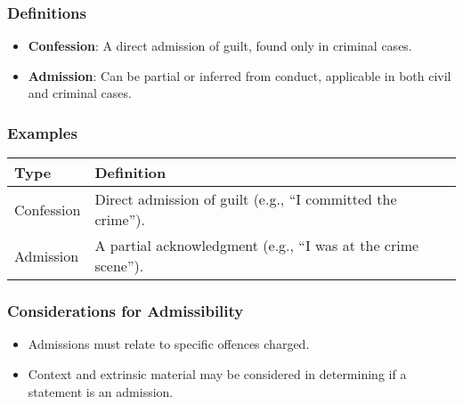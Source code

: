 \subsubsection{Definitions}\label{definitions-2}

\begin{itemize}
\tightlist
\item
  \textbf{Confession}: A direct admission of guilt, found only in
  criminal cases.
\item
  \textbf{Admission}: Can be partial or inferred from conduct,
  applicable in both civil and criminal cases.
\end{itemize}

\subsubsection{Examples}\label{examples}

\begin{longtable}[]{@{}
  >{\raggedright\arraybackslash}p{}
  >{\raggedright\arraybackslash}p{}@{}}
\toprule\noalign{}
\begin{minipage}[b]{\linewidth}\raggedright
Type
\end{minipage} & \begin{minipage}[b]{\linewidth}\raggedright
Definition
\end{minipage} \\
\midrule\noalign{}
\endhead
\bottomrule\noalign{}
\endlastfoot
Confession & Direct admission of guilt (e.g., ``I committed the
crime''). \\
Admission & A partial acknowledgment (e.g., ``I was at the crime
scene''). \\
\end{longtable}

\subsubsection{Considerations for
Admissibility}\label{considerations-for-admissibility}

\begin{itemize}
\tightlist
\item
  Admissions must relate to specific offences charged.
\item
  Context and extrinsic material may be considered in determining if a
  statement is an admission.
\end{itemize}

